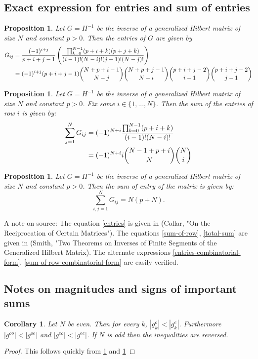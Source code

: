\documentclass{article}
\newtheorem{cor}[thm]{Corollary}
\newtheorem{prop}[thm]{Proposition}
\theoremstyle{definition}
\theoremstyle{remark}
\numberwithin{equation}{section}
\begin{document}
\subsection{Exact expression for entries and sum of entries}
\begin{prop}\label{inverse-hilbert-matrix-entry}
Let $G=H^{-1}$ be the inverse of a generalized Hilbert matrix of size $N$ and constant $p>0$. Then the entries of $G$ are given by 
\begin{align}\label{entries}
 G_{ij} &= \frac{(-1)^{i+j}}{p+i+j-1} \left( \frac{\prod_{k=0}^{N-1} (p+i+k)(p+j+k)}{(i-1)! (N-i)! (j-1)! (N-j)!}\right) \\
 &= \label{entries-combinatorial-form} (-1)^{i+j} (p+i+j-1) \dbinom{N+p+i-1}{N-j} \dbinom{N+p+j-1}{N-i} \dbinom{p+i+j-2}{i-1} \dbinom{p+i+j-2}{j-1}
\end{align}
\end{prop}

\begin{prop}\label{inverse-hilbert-matrix-row}
Let $G=H^{-1}$ be the inverse of a generalized Hilbert matrix of size $N$ and constant $p>0$. Fix some $i \in \{1,...,N\}$. Then the sum of the entries of row $i$ is given by: 
\begin{align}\label{sum-of-row}
\sum_{j=1}^N G_{ij} &= (-1)^{N+i} \frac{\prod_{k=0}^{N-1} (p+i+k)}{(i-1)! (N-i)!} \\
&= (-1)^{N+i} i \dbinom{N-1+p+i}{N} \dbinom{N}{i} \label{sum-of-row-combinatorial-form}
\end{align}
\end{prop}

\begin{prop}\label{inverse-hilbert-matrix-total} 
Let $G=H^{-1}$ be the inverse of a generalized Hilbert matrix of size $N$ and constant $p>0$. Then the sum of entry of the matrix is given by:
\begin{equation}\label{total-sum}
\sum_{i,j=1}^N G_{ij} = N(p+N).
\end{equation}
\end{prop} 
A note on source: The equation \ref{entries} is given in (Collar, "On the Reciprocation of Certain Matrices"). The equations \ref{sum-of-row}, \ref{total-sum} are given in (Smith, "Two Theorems on Inverses of Finite Segments of the Generalized Hilbert Matrix). The alternate expressions \ref{entries-combinatorial-form}, \ref{sum-of-row-combinatorial-form} are easily verified. 

\subsection{Notes on magnitudes and signs of important sums}
\begin{cor}
Let $N$ be even. Then for every $k$,  $|g_k^o| < |g_k^e|$. Furthermore $|g^{oo}| < |g^{oe}|$ and $|g^{eo}| < |g^{ee}|$.  If $N$ is odd then the inequalities are reversed. 
\end{cor}
\begin{proof}
This follows quickly from \ref{inverse-hilbert-matrix-row} and \ref{inverse-hilbert-matrix-entry}
\end{proof}
\end{document}

